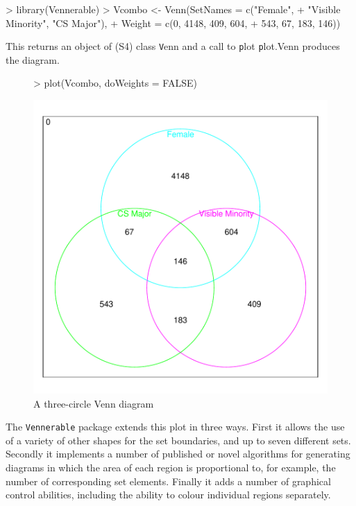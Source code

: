 \documentclass[a4paper]{article}
\begin{document}
\begin{Schunk}
\begin{Sinput}
> library(Vennerable)
> Vcombo <- Venn(SetNames = c("Female", 
+     "Visible Minority", "CS Major"), 
+     Weight = c(0, 4148, 409, 604, 
+         543, 67, 183, 146))
\end{Sinput}
\end{Schunk}
This returns an object of (S4) class {\texttt Venn} and 
a call to {\texttt plot} {\texttt plot.Venn} produces the diagram.
\begin{figure}[H]\begin{center}
\begin{Schunk}
\begin{Sinput}
> plot(Vcombo, doWeights = FALSE)
\end{Sinput}
\end{Schunk}
\includegraphics{Vennfig-pVN3}
\caption{A three-circle Venn diagram} 
\label{fig:canonical}
\end{center}\end{figure}

The \texttt{Vennerable} package extends this plot in three ways. First
it allows the use of a variety of other shapes for
the set boundaries, and up to seven different sets.
Secondly it implements a number of published or novel
algorithms for generating diagrams in which the area
of each region is proportional to, for example, the number
of corresponding set elements. Finally it adds a number of
graphical control abilities, including the ability to colour individual
regions separately.
\end{document}
